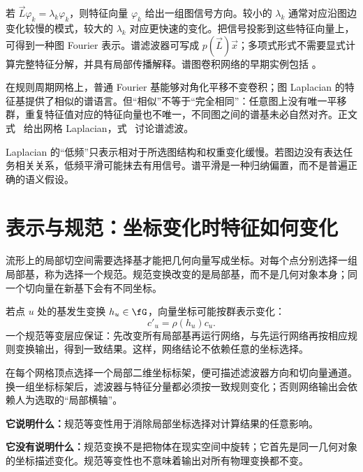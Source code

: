 若 $\vec{L}\varphi_k=\lambda_k\varphi_k$，则特征向量 $\varphi_k$ 给出一组图信号方向。较小的 $\lambda_k$ 通常对应沿图边变化较慢的模式，较大的 $\lambda_k$ 对应更快速的变化。把信号投影到这些特征向量上，可得到一种图 Fourier 表示。谱滤波器可写成 $p(\vec{L})\vec{x}$；多项式形式不需要显式计算完整特征分解，并具有局部传播解释。谱图卷积网络的早期实例包括 \citet{defferrard2016convolutional}。

在规则周期网格上，普通 Fourier 基能够对角化平移不变卷积；图 Laplacian 的特征基提供了相似的谱语言。但“相似”不等于“完全相同”：任意图上没有唯一平移群，重复特征值对应的特征向量也不唯一，不同图之间的谱基未必自然对齐。正文式~ 给出网格 Laplacian，式~ 讨论谱滤波。

\begin{tcolorbox}[width=\linewidth,colback=boxgray!35,colframe=darkgry,title=常见误解：低频不等于语义上重要]
Laplacian 的“低频”只表示相对于所选图结构和权重变化缓慢。若图边没有表达任务相关关系，低频平滑可能抹去有用信号。谱平滑是一种归纳偏置，而不是普遍正确的语义假设。
\end{tcolorbox}

\section{表示与规范：坐标变化时特征如何变化}
\label{app:primer:gauge}

流形上的局部切空间需要选择基才能把几何向量写成坐标。对每个点分别选择一组局部基，称为选择一个规范。规范变换改变的是局部基，而不是几何对象本身；同一个切向量在新基下会有不同坐标。

若点 $u$ 处的基发生变换 $h_u\in\fG$，向量坐标可能按群表示变化：
\begin{equation}
c'_u=\rho(h_u)c_u.
\label{app:primer:gauge-change}
\end{equation}
一个规范等变层应保证：先改变所有局部基再运行网络，与先运行网络再按相应规则变换输出，得到一致结果。这样，网络结论不依赖任意的坐标选择。

\begin{tcolorbox}[width=\linewidth,colback=boxgray!35,colframe=darkgry,title=深度学习实例：网格曲面上的方向卷积]
在每个网格顶点选择一个局部二维坐标标架，便可描述滤波器方向和切向量通道。换一组坐标标架后，滤波器与特征分量都必须按一致规则变化；否则网络输出会依赖人为选取的“局部横轴”。

\textbf{它说明什么：}规范等变性用于消除局部坐标选择对计算结果的任意影响。

\textbf{它没有说明什么：}规范变换不是把物体在现实空间中旋转；它首先是同一几何对象的坐标描述变化。规范等变性也不意味着输出对所有物理变换都不变。
\end{tcolorbox}

